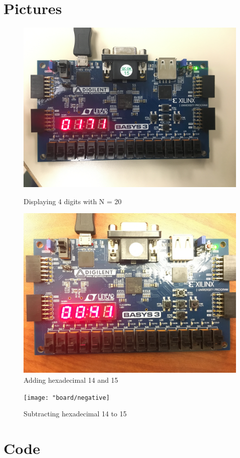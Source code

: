 \documentclass[11pt]{article}
\newcommand{\Verilog}[2][]{%
	
}
\begin{document}
\section*{Pictures}
\begin{figure}[ht]
	\centering
	\includegraphics[width=12cm]{"board/4digit"}
	\caption{Displaying 4 digits with N = 20}
	\includegraphics[width=12cm]{"board/positive"}
	\caption{Adding hexadecimal 14 and 15}
\end{figure}
\begin{figure}[ht]
	\centering
	\texttt{[image: "board/negative]}
	\caption{Subtracting hexadecimal 14 to 15}
\end{figure}

\section*{Code}
\Verilog[firstline=23,caption=Counter Implementation]{../verilog_code/counter.sv}
\Verilog[firstline=23,caption=Counter Test Bench]{../verilog_code/counter_test.sv}
\Verilog[firstline=23,caption=show\_2c Implementation]{../verilog_code/show_2c.sv}
\Verilog[firstline=23,caption=show\_2c Test Bench]{../verilog_code/show_2c_test.sv}
\Verilog[firstline=23,caption=Wrapper Implementation]{../verilog_code/wrapper.sv}
\Verilog[firstline=23,caption=Top-Level Implementation]{../verilog_code/calc_lab10.sv}
\end{document}
